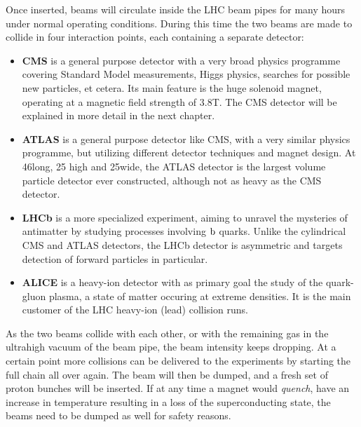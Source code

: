 Once inserted, beams will circulate inside the LHC beam pipes for many hours under
normal operating conditions. During this time the two beams are made to collide in four interaction
points, each containing a separate detector: 
\begin{itemize}
  \item \textbf{CMS} is a general purpose detector with a very broad physics programme covering
Standard Model measurements, Higgs physics, searches for possible new particles, et cetera. Its
main feature is the huge solenoid magnet, operating at a magnetic field strength of 3.8\unit{T}. The
CMS detector will be explained in more detail in the next chapter. 
  \item \textbf{ATLAS} is a general purpose detector like CMS, with a very similar physics
programme, but utilizing different detector techniques and magnet design. At 46\meter long, 25\meter
high and 25\meter wide, the ATLAS detector is the largest volume particle detector ever
constructed, although not as heavy as the CMS detector. 
  \item \textbf{LHCb} is a more specialized experiment, aiming to unravel the mysteries of
antimatter by studying processes involving $\mathrm{b}$ quarks. Unlike the cylindrical CMS and ATLAS
detectors, the LHCb detector is asymmetric and targets detection of forward particles in particular.
  \item \textbf{ALICE} is a heavy-ion detector with as primary goal the study of the quark-gluon
plasma, a state of matter occuring at extreme densities. It is the main customer of the LHC
heavy-ion (lead) collision runs.
\end{itemize}
As the two beams collide with each other, or with the remaining gas in the ultrahigh vacuum of
the beam pipe, the beam
intensity keeps dropping. At a certain point more collisions can be delivered to the experiments by
starting the full chain all over again. The beam will then be dumped, and a fresh set of proton
bunches will be inserted. 
If at any time a magnet would \textit{quench}, have an increase in temperature resulting in a loss
of the superconducting state, the beams need to be dumped as well for safety reasons.  

